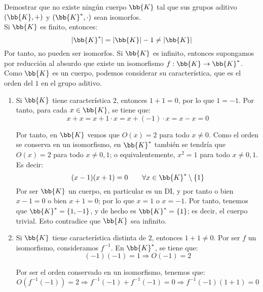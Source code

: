 \begin{ejercicio}\label{ej:2.39}
    Demostrar que no existe ningún cuerpo $\bb{K}$ tal que sus grupos aditivo $(\bb{K}, +)$ y $(\bb{K}^{\ast}, \cdot)$ sean isomorfos.\\

    Si $\bb{K}$ es finito, entonces:
    \begin{equation*}
        |\bb{K}^*|=|\bb{K}|-1\neq |\bb{K}|
    \end{equation*}
    Por tanto, no pueden ser isomorfos. Si $\bb{K}$ es infinito, entonces supongamos por reducción al absurdo que existe un isomorfismo $f:\bb{K}\to \bb{K}^*$. Como $\bb{K}$ es un cuerpo, podemos considerar su característica, que es el orden del $1$ en el grupo aditivo.
    \begin{enumerate}
        \item Si $\bb{K}$ tiene característica $2$, entonces $1+1=0$, por lo que $1=-1$. Por tanto, para cada $x\in \bb{K}$, se tiene que:
        \begin{equation*}
            x+x=x+1\cdot x = x+(-1)\cdot x = x-x=0
        \end{equation*}

        Por tanto, en $\bb{K}$ vemos que $O(x)=2$ para todo $x\neq 0$. Como el orden se conserva en un isomorfismo, en $\bb{K}^*$ también se tendría que $O(x)=2$ para todo $x\neq 0,1$; o equivalentemente, $x^2=1$ para todo $x\neq 0,1$. Es decir:
        \begin{equation*}
            (x-1)(x+1)=0\qquad \forall x\in \bb{K}^*\setminus \{1\}
        \end{equation*}
        Por ser $\bb{K}$ un cuerpo, en particular es un DI, y por tanto o bien $x-1=0$ o bien $x+1=0$; por lo que $x=1$ o $x=-1$. Por tanto, tenemos que $\bb{K}^*=\{1,-1\}$, y de hecho es $\bb{K}^*=\{1\}$; es decir, el cuerpo trivial. Esto contradice que $\bb{K}$ sea infinito.

        \item Si $\bb{K}$ tiene característica distinta de $2$, entonces $1+1\neq 0$. Por ser $f$ un isomorfismo, consideramos $f^{-1}$. En $\bb{K}^*$, se tiene que:
        \begin{equation*}
            (-1)(-1)=1\Longrightarrow O(-1)=2
        \end{equation*}

        Por ser el orden conservado en un isomorfismo, tenemos que:
        \begin{equation*}
            O(f^{-1}(-1))=2\Longrightarrow f^{-1}(-1) + f^{-1}(-1) = 0
            \Longrightarrow f^{-1}(-1)\left(1+1\right)=0
        \end{equation*}


\end{enumerate}
\end{ejercicio}
